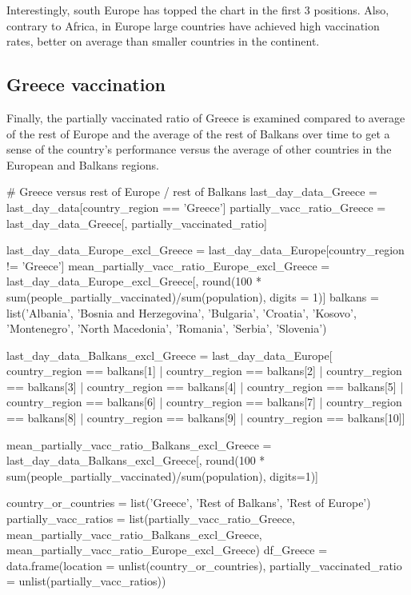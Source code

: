 Interestingly, south Europe has topped the chart in the first 3 positions. Also, contrary to Africa, in Europe large countries have achieved high vaccination rates, better on average than smaller countries in the continent.

\subsection{Greece vaccination}
Finally, the partially vaccinated ratio of Greece is examined compared to average of the rest of Europe and the average of the rest of Balkans over time to get a sense of the country's performance versus the average of other countries in the European and Balkans regions.


\begin{Rcode}{\scriptsize}
# Greece versus rest of Europe / rest of Balkans
last_day_data_Greece = last_day_data[country_region == 'Greece']
partially_vacc_ratio_Greece = last_day_data_Greece[, partially_vaccinated_ratio]

last_day_data_Europe_excl_Greece = last_day_data_Europe[country_region != 'Greece']
mean_partially_vacc_ratio_Europe_excl_Greece = last_day_data_Europe_excl_Greece[, 
        round(100 * sum(people_partially_vaccinated)/sum(population), digits = 1)]
balkans = list('Albania', 'Bosnia and Herzegovina', 'Bulgaria',
               'Croatia', 'Kosovo', 'Montenegro', 'North Macedonia',
               'Romania', 'Serbia', 'Slovenia')
               
last_day_data_Balkans_excl_Greece = last_day_data_Europe[
  country_region == balkans[1] | country_region == balkans[2] |
  country_region == balkans[3] | country_region == balkans[4] |
  country_region == balkans[5] | country_region == balkans[6] |
  country_region == balkans[7] | country_region == balkans[8] |
  country_region == balkans[9] | country_region == balkans[10]]

mean_partially_vacc_ratio_Balkans_excl_Greece = last_day_data_Balkans_excl_Greece[, 
          round(100 * sum(people_partially_vaccinated)/sum(population), digits=1)]

country_or_countries = list('Greece', 'Rest of Balkans', 'Rest of Europe')
partially_vacc_ratios = list(partially_vacc_ratio_Greece,
                 mean_partially_vacc_ratio_Balkans_excl_Greece,
                 mean_partially_vacc_ratio_Europe_excl_Greece)
df_Greece = data.frame(location = unlist(country_or_countries), 
                       partially_vaccinated_ratio = unlist(partially_vacc_ratios))


\end{Rcode}
